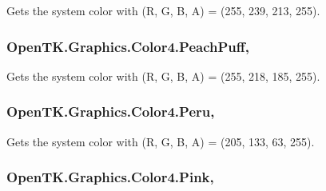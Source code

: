 Gets the system color with (R, G, B, A) = (255, 239, 213, 255). 

\hypertarget{struct_open_t_k_1_1_graphics_1_1_color4_a6dcf319fd510a7e1271ffa06598ef96c}{
\subsubsection[{Peach\-Puff}]{ Open\-T\-K.\-Graphics.\-Color4.\-Peach\-Puff\hspace{0.3cm}{\ttfamily [static]}, {\ttfamily [get]}}}\label{struct_open_t_k_1_1_graphics_1_1_color4_a6dcf319fd510a7e1271ffa06598ef96c}


Gets the system color with (R, G, B, A) = (255, 218, 185, 255). 

\hypertarget{struct_open_t_k_1_1_graphics_1_1_color4_a365d1c5aa547d95a11d06fe1e89bada6}{
\subsubsection[{Peru}]{ Open\-T\-K.\-Graphics.\-Color4.\-Peru\hspace{0.3cm}{\ttfamily [static]}, {\ttfamily [get]}}}\label{struct_open_t_k_1_1_graphics_1_1_color4_a365d1c5aa547d95a11d06fe1e89bada6}


Gets the system color with (R, G, B, A) = (205, 133, 63, 255). 

\hypertarget{struct_open_t_k_1_1_graphics_1_1_color4_a6b5216060e0e0dd29e47f8f7048b2bd1}{
\subsubsection[{Pink}]{ Open\-T\-K.\-Graphics.\-Color4.\-Pink\hspace{0.3cm}{\ttfamily [static]}, {\ttfamily [get]}}}\label{struct_open_t_k_1_1_graphics_1_1_color4_a6b5216060e0e0dd29e47f8f7048b2bd1}


